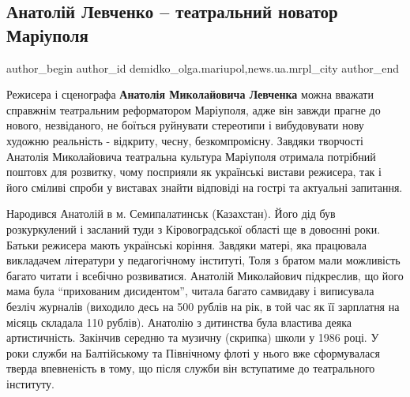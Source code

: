  
 
 
 
 
 
\subsection{Анатолій Левченко – театральний новатор Маріуполя}
\label{sec:06_06_2019.stz.news.ua.mrpl_city.1.anatolij_levchenko_teatr_novator}
 
\ifcmt
 author_begin
   author_id demidko_olga.mariupol,news.ua.mrpl_city
 author_end
\fi


Режисера і сценографа \textbf{Анатолія Миколайовича Левченка} можна вважати справжнім
театральним реформатором Маріуполя, адже він завжди прагне до нового,
незвіданого, не боїться руйнувати стереотипи і вибудовувати нову художню
реальність - відкриту, чесну, безкомпромісну. Завдяки творчості Анатолія
Миколайовича театральна культура Маріуполя отримала потрібний поштовх для
розвитку, чому посприяли як українські вистави режисера, так і його сміливі
спроби у виставах знайти відповіді на гострі та актуальні запитання.


Народився Анатолій в м. Семипалатинськ (Казахстан). Його дід був розкуркулений
і засланий туди з Кіровоградської області ще в довоєнні роки. Батьки режисера
мають українські коріння. Завдяки матері, яка працювала викладачем літератури у
педагогічному інституті, Толя з братом мали можливість багато читати і всебічно
розвиватися. Анатолій Миколайович підкреслив, що його мама була \enquote{прихованим
дисидентом}, читала багато самвидаву і виписувала безліч журналів (виходило
десь на 500 рублів на рік, в той час як її зарплатня на місяць складала 110
рублів). Анатолію з дитинства була властива деяка артистичність. Закінчив
середню та музичну (скрипка) школи у 1986 році. У роки служби на Балтійському
та Північному флоті у нього вже сформувалася тверда впевненість в тому, що
після служби він вступатиме до театрального інституту.

